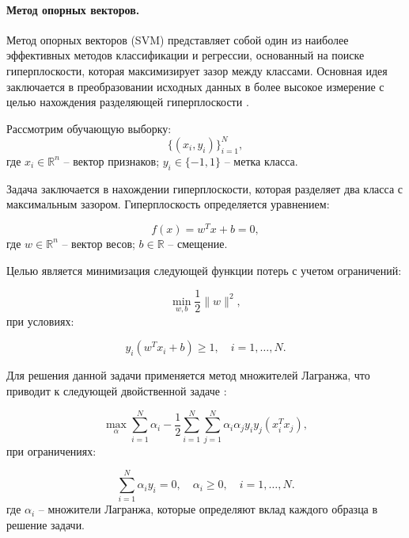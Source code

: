 \paragraph{Метод опорных векторов.}

Метод опорных векторов (SVM) представляет собой один из наиболее эффективных методов классификации и
регрессии, основанный на поиске гиперплоскости, которая максимизирует зазор между классами.
Основная идея заключается в преобразовании исходных данных в более
высокое измерение с целью нахождения разделяющей гиперплоскости \cite{Jakkula2006}.

Рассмотрим обучающую выборку:
\begin{equation*}
    \{(x_i, y_i)\}_{i=1}^N,
\end{equation*}
где $x_i \in \mathbb{R}^n$ -- вектор признаков;
$y_i \in \{-1, 1\}$ -- метка класса.

Задача заключается в нахождении гиперплоскости,
которая разделяет два класса с максимальным зазором. Гиперплоскость определяется уравнением:

\begin{equation*}
    f(x) = w^T x + b = 0,
\end{equation*}
где $w \in \mathbb{R}^n$ -- вектор весов;
$b \in \mathbb{R}$ -- смещение.

Целью является минимизация следующей функции потерь с учетом ограничений:

\begin{equation*}
    \min_{w, b} \frac{1}{2} \|w\|^2,
\end{equation*}
при условиях:

\begin{equation*}
    y_i (w^T x_i + b) \geq 1, \quad i = 1, \ldots, N.
\end{equation*}

Для решения данной задачи применяется метод множителей Лагранжа,
что приводит к следующей двойственной задаче \cite{Patle2013}:

\begin{equation*}
    \max_{\alpha} \sum_{i=1}^N \alpha_i - \frac{1}{2} \sum_{i=1}^N \sum_{j=1}^N \alpha_i \alpha_j y_i y_j (x_i^T x_j),
\end{equation*}
при ограничениях:

\begin{equation*}
    \sum_{i=1}^N \alpha_i y_i = 0, \quad \alpha_i \geq 0, \quad i = 1, \ldots, N.
\end{equation*}
где $\alpha_i$ -- множители Лагранжа, которые определяют вклад каждого образца в решение задачи.

